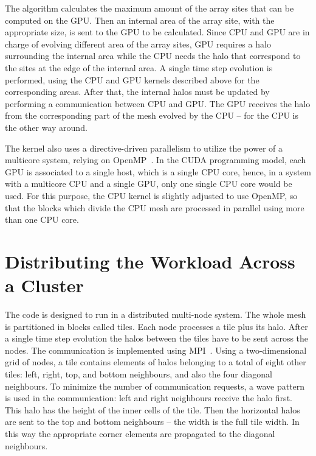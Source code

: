 The algorithm calculates the maximum amount of the array sites that can be computed on the GPU. Then an internal area of the array site, with the appropriate size, is sent to the GPU to be calculated. Since CPU and GPU are in charge of evolving different area of the array sites, GPU requires a halo surrounding the internal area while the CPU needs the halo that correspond to the sites at the edge of the internal area. A single time step evolution is performed, using the CPU and GPU kernels described above for the corresponding areas. After that, the internal halos must be updated by performing a communication between CPU and GPU. The GPU receives the halo from the corresponding part of the mesh evolved by the CPU -- for the CPU is the other way around. 

The kernel also uses a directive-driven parallelism to utilize the power of a multicore system, relying on OpenMP~\citep{dagum1998openmp}. In the CUDA programming model, each GPU is associated to a single host, which is a single CPU core, hence, in a system with a multicore CPU and a single GPU, only one single CPU core would be used. For this purpose, the CPU kernel is slightly adjusted to use OpenMP, so that the blocks which divide the CPU mesh are processed in parallel using more than one CPU core.

\section{Distributing the Workload Across a Cluster}
The code is designed to run in a distributed multi-node system. The whole mesh is partitioned in blocks called tiles. Each node processes a tile plus its halo. After a single time step evolution the halos between the tiles have to be sent across the nodes. The communication is implemented using MPI~\citep{snir1998mpi}. Using a two-dimensional grid of nodes, a tile contains elements of halos belonging to a total of eight other tiles: left, right, top, and bottom neighbours, and also the four diagonal neighbours. To minimize the number of communication requests, a wave pattern is used in the communication: left and right neighbours receive the halo first. This halo has the height of the inner cells of the tile. Then the horizontal halos are sent to the top and bottom neighbours – the width is the full tile width. In this way the appropriate corner elements are propagated to the diagonal neighbours.

